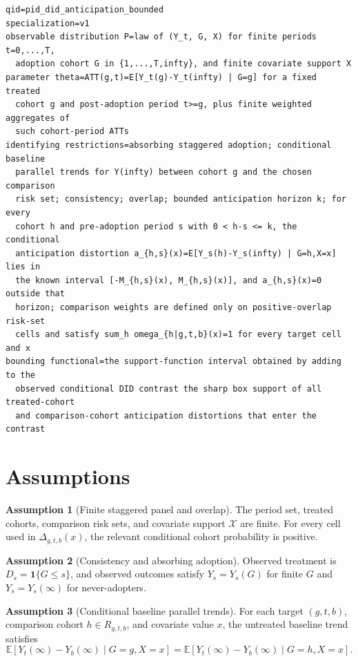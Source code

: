 \documentclass[11pt]{article}
\newcommand{\E}{\mathbb{E}}
\newcommand{\one}{\mathbf{1}}
\theoremstyle{definition}
\newtheorem{assumption}{Assumption}
\theoremstyle{plain}
\theoremstyle{remark}
\begin{document}
\begin{verbatim}
qid=pid_did_anticipation_bounded
specialization=v1
observable distribution P=law of (Y_t, G, X) for finite periods t=0,...,T,
  adoption cohort G in {1,...,T,infty}, and finite covariate support X
parameter theta=ATT(g,t)=E[Y_t(g)-Y_t(infty) | G=g] for a fixed treated
  cohort g and post-adoption period t>=g, plus finite weighted aggregates of
  such cohort-period ATTs
identifying restrictions=absorbing staggered adoption; conditional baseline
  parallel trends for Y(infty) between cohort g and the chosen comparison
  risk set; consistency; overlap; bounded anticipation horizon k; for every
  cohort h and pre-adoption period s with 0 < h-s <= k, the conditional
  anticipation distortion a_{h,s}(x)=E[Y_s(h)-Y_s(infty) | G=h,X=x] lies in
  the known interval [-M_{h,s}(x), M_{h,s}(x)], and a_{h,s}(x)=0 outside that
  horizon; comparison weights are defined only on positive-overlap risk-set
  cells and satisfy sum_h omega_{h|g,t,b}(x)=1 for every target cell and x
bounding functional=the support-function interval obtained by adding to the
  observed conditional DID contrast the sharp box support of all treated-cohort
  and comparison-cohort anticipation distortions that enter the contrast
\end{verbatim}

\section{Assumptions}
\begin{assumption}[Finite staggered panel and overlap]\label{ass:finite-overlap}
The period set, treated cohorts, comparison risk sets, and covariate support \(\mathcal{X}\) are finite.  For every cell used in \(\Delta_{g,t,b}(x)\), the relevant conditional cohort probability is positive.
\end{assumption}

\begin{assumption}[Consistency and absorbing adoption]\label{ass:consistency}
Observed treatment is \(D_s=\one\{G\le s\}\), and observed outcomes satisfy \(Y_s=Y_s(G)\) for finite \(G\) and \(Y_s=Y_s(\infty)\) for never-adopters.
\end{assumption}

\begin{assumption}[Conditional baseline parallel trends]\label{ass:baseline-pt}
For each target \((g,t,b)\), comparison cohort \(h\in R_{g,t,b}\), and covariate value \(x\), the untreated baseline trend satisfies
\[
  \E[Y_t(\infty)-Y_b(\infty)\mid G=g,X=x]
  =
  \E[Y_t(\infty)-Y_b(\infty)\mid G=h,X=x].
\]
\end{assumption}
\end{document}

